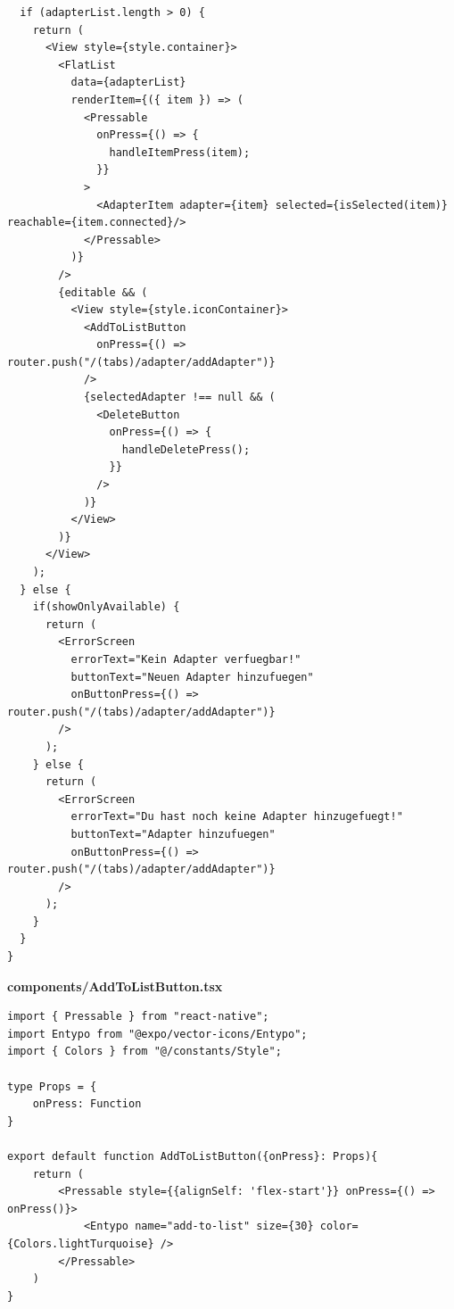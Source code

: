 \documentclass[11pt, twoside]{article}
\begin{document}
\begin{lstlisting}
  if (adapterList.length > 0) {
    return (
      <View style={style.container}>
        <FlatList
          data={adapterList}
          renderItem={({ item }) => (
            <Pressable
              onPress={() => {
                handleItemPress(item);
              }}
            >
              <AdapterItem adapter={item} selected={isSelected(item)} reachable={item.connected}/>
            </Pressable>
          )}
        />
        {editable && (
          <View style={style.iconContainer}>
            <AddToListButton
              onPress={() => router.push("/(tabs)/adapter/addAdapter")}
            />
            {selectedAdapter !== null && (
              <DeleteButton
                onPress={() => {
                  handleDeletePress();
                }}
              />
            )}
          </View>
        )}
      </View>
    );
  } else {
    if(showOnlyAvailable) {
      return (
        <ErrorScreen
          errorText="Kein Adapter verfuegbar!"
          buttonText="Neuen Adapter hinzufuegen"
          onButtonPress={() => router.push("/(tabs)/adapter/addAdapter")}
        />
      );
    } else {
      return (
        <ErrorScreen
          errorText="Du hast noch keine Adapter hinzugefuegt!"
          buttonText="Adapter hinzufuegen"
          onButtonPress={() => router.push("/(tabs)/adapter/addAdapter")}
        />
      );
    }
  }
}
\end{lstlisting}

\textbf{components/AddToListButton.tsx}
\begin{lstlisting}
import { Pressable } from "react-native";
import Entypo from "@expo/vector-icons/Entypo";
import { Colors } from "@/constants/Style";

type Props = {
    onPress: Function
}

export default function AddToListButton({onPress}: Props){
    return (
        <Pressable style={{alignSelf: 'flex-start'}} onPress={() => onPress()}>
            <Entypo name="add-to-list" size={30} color={Colors.lightTurquoise} />
        </Pressable>
    )
}
\end{lstlisting}
\end{document}
